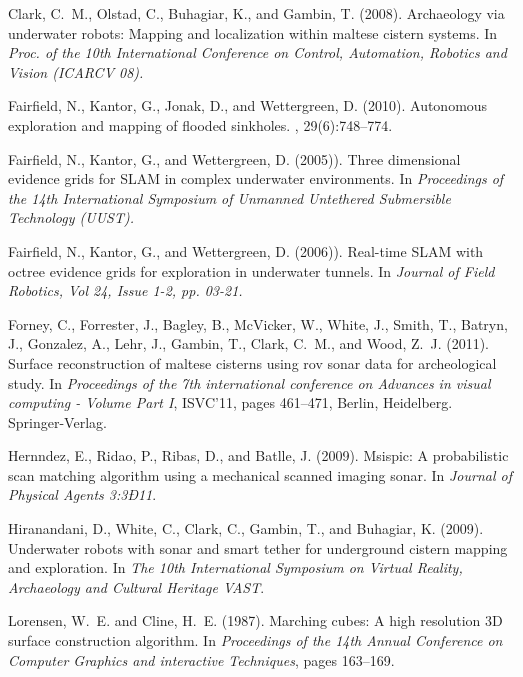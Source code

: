 \documentclass{llncs}
\begin{document}
\begin{thebibliography}{9}
Clark, C.~M., Olstad, C., Buhagiar, K., and Gambin, T. (2008).
\newblock Archaeology via underwater robots: Mapping and localization within
  maltese cistern systems.
\newblock In {\em Proc. of the 10th International Conference on Control,
  Automation, Robotics and Vision (ICARCV 08).}

Fairfield, N., Kantor, G., Jonak, D., and Wettergreen, D. (2010).
\newblock Autonomous exploration and mapping of flooded sinkholes.
, 29(6):748--774.

Fairfield, N., Kantor, G., and Wettergreen, D. (2005)).
\newblock Three dimensional evidence grids for {SLAM} in complex underwater
  environments.
\newblock In {\em Proceedings of the 14th International Symposium of Unmanned
  Untethered Submersible Technology (UUST).}

Fairfield, N., Kantor, G., and Wettergreen, D. (2006)).
\newblock Real-time {SLAM} with octree evidence grids for exploration in
  underwater tunnels.
\newblock In {\em Journal of Field Robotics, Vol 24, Issue 1-2, pp. 03-21.}

Forney, C., Forrester, J., Bagley, B., McVicker, W., White, J., Smith, T.,
  Batryn, J., Gonzalez, A., Lehr, J., Gambin, T., Clark, C.~M., and Wood, Z.~J.
  (2011).
\newblock Surface reconstruction of maltese cisterns using rov sonar data for
  archeological study.
\newblock In {\em Proceedings of the 7th international conference on Advances
  in visual computing - Volume Part I}, ISVC'11, pages 461--471, Berlin,
  Heidelberg. Springer-Verlag.

Hernndez, E., Ridao, P., Ribas, D., and Batlle, J. (2009).
\newblock Msispic: A probabilistic scan matching algorithm using a mechanical
  scanned imaging sonar.
\newblock In {\em Journal of Physical Agents 3:3Ð11}.

Hiranandani, D., White, C., Clark, C., Gambin, T., and Buhagiar, K. (2009).
\newblock Underwater robots with sonar and smart tether for underground cistern
  mapping and exploration.
\newblock In {\em The 10th International Symposium on Virtual Reality,
  Archaeology and Cultural Heritage VAST}.

Lorensen, W.~E. and Cline, H.~E. (1987).
\newblock Marching cubes: A high resolution {3D} surface construction
  algorithm.
\newblock In {\em Proceedings of the 14th Annual Conference on Computer
  Graphics and interactive Techniques}, pages 163--169.


\end{thebibliography}
\end{document}
